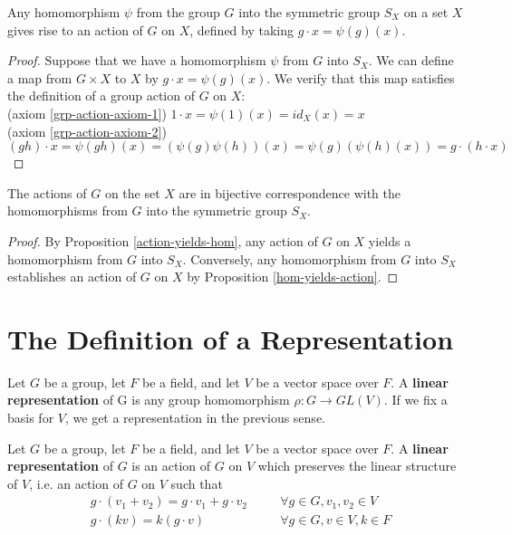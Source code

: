 \begin{prop} \label{hom-yields-action}
Any homomorphism $\psi$ from the group $G$ into the symmetric group $S_X$ on a set $X$ gives rise to an action of $G$ on $X$, defined by taking $g \cdot x = \psi(g)(x)$.
\end{prop}
\begin{proof}
Suppose  that we have a homomorphism $\psi$ from $G$ into $S_X$.  We can define a map from $G \times X$ to $X$  by $g \cdot x = \psi(g)(x)$. We verify that this map satisfies the definition of a group action of $G$ on $X$:
\\ (axiom \ref{grp-action-axiom-1}) \quad $1 \cdot x = \psi(1)(x) = id_X(x) = x$
\\(axiom \ref{grp-action-axiom-2}) \quad $(gh) \cdot x = \psi(gh)(x) = (\psi(g)\psi(h))(x) = \psi(g)(\psi(h)(x)) = g \cdot (h \cdot x)$
\end{proof}

\begin{cor} \label{equivalence-of-actions}
The actions of $G$ on the set $X$ are in bijective correspondence with the homomorphisms from $G$ into the symmetric group $S_X$.
\end{cor}
\begin{proof}
By Proposition \ref{action-yields-hom}, any action of $G$ on $X$ yields a homomorphism from $G$ into $S_X$.    Conversely, any homomorphism from $G$ into $S_X$ establishes an action of $G$ on $X$ by Proposition \ref{hom-yields-action}.
\end{proof}



%
\section{The Definition of a Representation}
\begin{defn}
\label{rep-def-1}
Let $G$ be a group, let $F$ be a field, and let $V$ be a vector space over $F$.  A \textbf{linear representation} of G is any group homomorphism $\rho\colon G \to GL(V)$. If we fix a basis for $V$, we get a representation in the previous sense.\end{defn}


\begin{defn} \label{rep-def-2}Let $G$ be a group, let $F$ be a field, and let $V$ be a vector space over $F$. A \textbf{linear representation} of $G$ is an action of $G$ on $V$ which preserves the linear structure of $V$, i.e. an action of $G$ on $V$ such that
\begin{align}
\label{rep-axiom-1}&g \cdot (v_1+v_2)=g \cdot v_1+g \cdot v_2 \quad && \forall g \in G, v_1, v_2 \in V \\
\label{rep-axiom-2}&g \cdot (kv) = k (g \cdot v) \quad && \forall g \in G, v \in V, k \in F
\end{align}
 \end{defn}
 
